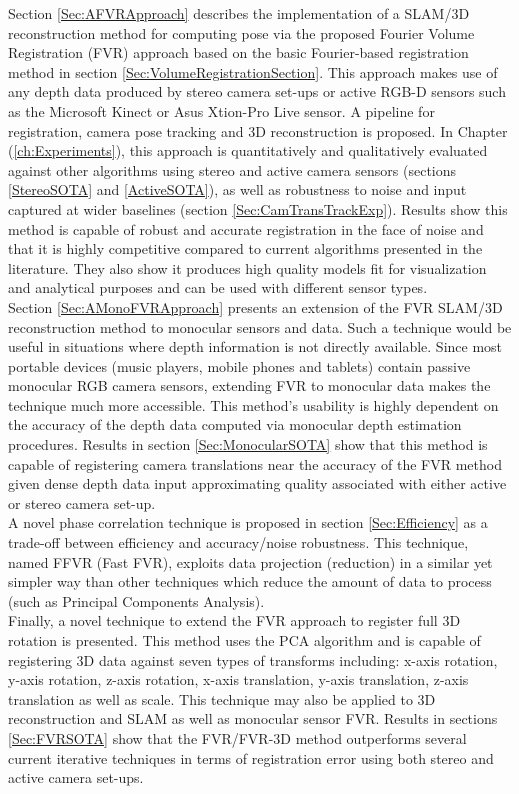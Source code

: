 Section \ref{Sec:AFVRApproach} describes the implementation of a SLAM/3D reconstruction method for computing pose via the proposed Fourier Volume Registration (FVR) approach based on the basic Fourier-based registration method in section \ref{Sec:VolumeRegistrationSection}. This approach makes use of any depth data produced by stereo camera set-ups or active RGB-D sensors such as the Microsoft Kinect or Asus Xtion-Pro Live sensor. A pipeline for registration, camera pose tracking and 3D reconstruction is proposed. In Chapter (\ref{ch:Experiments}), this approach is quantitatively and qualitatively evaluated against other algorithms using stereo and active camera sensors (sections \ref{StereoSOTA} and \ref{ActiveSOTA}), as well as robustness to noise and input captured at wider baselines (section \ref{Sec:CamTransTrackExp}). Results show this method is capable of robust and accurate registration in the face of noise and that it is highly competitive compared to current algorithms presented in the literature. They also show it produces high quality models fit for visualization and analytical purposes and can be used with different sensor types.  \\

Section \ref{Sec:AMonoFVRApproach} presents an extension of the FVR SLAM/3D reconstruction method to monocular sensors and data. Such a technique would be useful in situations where depth information is not directly available. Since most portable devices (music players, mobile phones and tablets) contain passive monocular RGB camera sensors, extending FVR to monocular data makes the technique much more accessible. This method's usability is highly dependent on the accuracy of the depth data computed via monocular depth estimation procedures. Results in section \ref{Sec:MonocularSOTA} show that this method is capable of registering camera translations near the accuracy of the FVR method given dense depth data input approximating quality associated with either active or stereo camera set-up.  \\

A novel phase correlation technique is proposed in section \ref{Sec:Efficiency} as a trade-off between efficiency and accuracy/noise robustness. This technique, named FFVR (Fast FVR), exploits data projection (reduction) in a similar yet simpler way than other techniques which reduce the amount of data to process (such as Principal Components Analysis). \\

Finally, a novel technique to extend the FVR approach to register full 3D rotation is presented. This method uses the PCA algorithm and is capable of registering 3D data against seven types of transforms including: x-axis rotation, y-axis rotation, z-axis rotation, x-axis translation, y-axis translation, z-axis translation as well as scale. This technique may also be applied to 3D reconstruction and SLAM as well as monocular sensor FVR. Results in sections \ref{Sec:FVRSOTA} show that the FVR/FVR-3D method outperforms several current iterative techniques in terms of registration error using both stereo and active camera set-ups.  \\